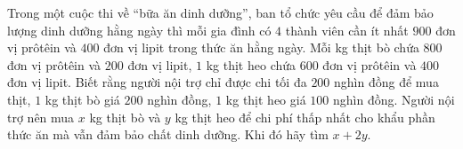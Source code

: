 \begin{ex}
Trong một cuộc thi về ``bữa ăn dinh dưỡng'', ban tổ chức yêu cầu để đảm bảo lượng dinh dưỡng hằng ngày thì mỗi gia đình có $4$ thành viên cần ít nhất $900$ đơn vị prôtêin và $400$ đơn vị lipit trong thức ăn hằng ngày. Mỗi kg thịt bò chứa $800$ đơn vị prôtêin và $200$ đơn vị lipit, $1$ kg thịt heo chứa $600$ đơn vị prôtêin và $400$ đơn vị lipit. Biết rằng người nội trợ chỉ được chi tối đa $200$ nghìn đồng để mua thịt, $1$ kg thịt bò giá $200$ nghìn đồng, $1$ kg thịt heo giá $100$ nghìn đồng. Người nội trợ nên mua $x$ kg thịt bò và $y$ kg thịt heo để chi phí thấp nhất cho khẩu phần thức ăn mà vẫn đảm bảo chất dinh dưỡng. Khi đó hãy tìm $x+2y$.
\end{ex}
